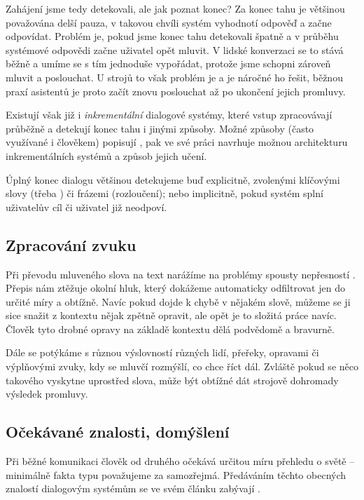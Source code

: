 Zahájení jsme tedy detekovali, ale jak poznat konec? Za konec tahu je
většinou považována delší pauza, v takovou chvíli systém vyhodnotí odpověď
a začne odpovídat. Problém je, pokud jsme konec tahu detekovali špatně a
v průběhu systémové odpovědi začne uživatel opět mluvit. V lidské konverzaci
se to stává běžně a umíme se s tím jednoduše vypořádat, protože jsme schopni
zároveň mluvit a poslouchat. U strojů to však problém je a je náročné ho řešit,
běžnou praxí asistentů
je proto začít znovu poslouchat až po ukončení jejich promluvy.

Existují však již i \textit{inkrementální} dialogové systémy, které
vstup zpracovávají průběžně a detekují konec tahu i jinými způsoby.
Možné způsoby (často využívané i člověkem) popisují \citet{turn_taking_taxonomy_2015},
\citet{khouzaimi_turn-taking_2016} pak ve své práci navrhuje
možnou architekturu inkrementálních systémů a způsob jejich učení.

Úplný konec dialogu většinou detekujeme buď explicitně, zvolenými klíčovými
slovy (třeba ) či frázemi (rozloučení); nebo implicitně, pokud
systém splní uživatelův cíl či uživatel již neodpoví.

\subsection{Zpracování zvuku}

Při převodu mluveného slova na text narážíme na problémy spousty nepřesností \citep[sekce 4.1]{glass_challenges_1999}.
Přepis nám ztěžuje okolní hluk, který dokážeme automaticky odfiltrovat jen do určité míry
a obtížně. Navíc pokud dojde k chybě v nějakém slově, můžeme se ji sice snažit
z kontextu nějak zpětně opravit, ale opět je to složitá práce navíc. Člověk
tyto drobné opravy na základě kontextu dělá podvědomě a bravurně.

Dále se potýkáme s různou výslovností různých lidí, přeřeky, opravami
či výplňovými zvuky, kdy se mluvčí rozmýšlí, co chce říct dál. Zvláště
pokud se něco takového vyskytne uprostřed slova, může být obtížné dát
strojově dohromady výsledek promluvy.

\subsection{Očekávané znalosti, domýšlení}

Při běžné komunikaci člověk od druhého očekává určitou míru přehledu o světě
-- minimálně fakta typu  považujeme za samozřejmá.
Předáváním těchto obecných znalostí dialogovým systémům se ve svém článku
zabývají \citet{young_augmenting_2018}.

